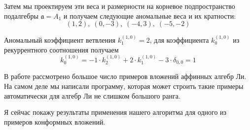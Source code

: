\documentclass[a4paper,12pt]{article}
\theoremstyle{definition} \newtheorem{Def}{Definition}
\begin{document}
Затем мы проектируем эти веса и размерности на корневое подпространство подалгебры
$\mathfrak{a}=A_1$ и получаем следующие аномальные веса и их кратности:
\begin{equation}
  \label{eq:25}
  (1,2),\; (0,-3),\; (-4,3),\; (-5,-2)
\end{equation}

Аномальный коэффициент ветвления  $k^{(1,0)}_{1}=2$, для коэффициента $k^{(1,0)}_{0}$ из
рекуррентного соотношения получаем
\begin{equation}
  \label{eq:23}
  k^{(1,0)}_{0}=-1\cdot k^{(1,0)}_2 +2\cdot k^{(1,0)}_1 - 3\cdot \delta_{0,0} = 1
\end{equation}

В работе рассмотрено большое число примеров вложений аффинных алгебр Ли. На самом деле мы написали
программу, которая может строить такие примеры автоматически для алгебр Ли не слишком большого
ранга.

Я сейчас покажу результаты применения нашего алгоритма для одного из примеров конформных вложений.
\end{document}
